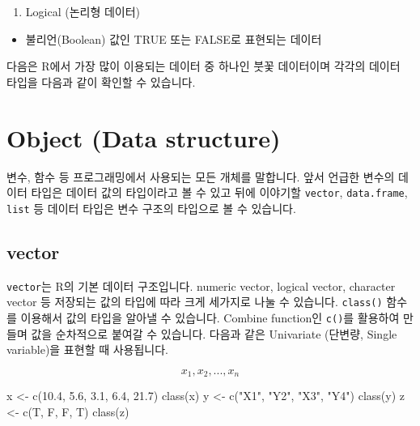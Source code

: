 \documentclass[
  a4paper,
]{book}
\newenvironment{Shaded}{\begin{snugshade}}{\end{snugshade}}
\newcommand{\FloatTok}[1]{\textcolor[rgb]{0.68,0.00,0.00}{#1}}
\newcommand{\FunctionTok}[1]{\textcolor[rgb]{0.28,0.35,0.67}{#1}}
\newcommand{\NormalTok}[1]{\textcolor[rgb]{0.00,0.23,0.31}{#1}}
\newcommand{\OtherTok}[1]{\textcolor[rgb]{0.00,0.23,0.31}{#1}}
\newcommand{\SpecialCharTok}[1]{\textcolor[rgb]{0.37,0.37,0.37}{#1}}
\newcommand{\StringTok}[1]{\textcolor[rgb]{0.13,0.47,0.30}{#1}}
\providecommand{\tightlist}{%
  \setlength{\itemsep}{0pt}\setlength{\parskip}{0pt}}\usepackage{longtable,booktabs,array}
\begin{document}
\begin{enumerate}
\def\labelenumi{\arabic{enumi}.}
\setcounter{enumi}{3}
\tightlist
\item
  Logical (논리형 데이터)
\end{enumerate}

\begin{itemize}
\tightlist
\item
  불리언(Boolean) 값인 TRUE 또는 FALSE로 표현되는 데이터
\end{itemize}

다음은 R에서 가장 많이 이용되는 데이터 중 하나인 붓꽃 데이터이며 각각의
데이터 타입을 다음과 같이 확인할 수 있습니다.

\begin{Shaded}
\end{Shaded}

\hypertarget{object-data-structure}{%
\section{Object (Data structure)}\label{object-data-structure}}

변수, 함수 등 프로그래밍에서 사용되는 모든 개체를 말합니다. 앞서 언급한
변수의 데이터 타입은 데이터 값의 타입이라고 볼 수 있고 뒤에 이야기할
\texttt{vector}, \texttt{data.frame}, \texttt{list} 등 데이터 타입은
변수 구조의 타입으로 볼 수 있습니다.

\hypertarget{vector}{%
\subsection{vector}\label{vector}}

\texttt{vector}는 R의 기본 데이터 구조입니다. numeric vector, logical
vector, character vector 등 저장되는 값의 타입에 따라 크게 세가지로 나눌
수 있습니다. \texttt{class()} 함수를 이용해서 값의 타입을 알아낼 수
있습니다. Combine function인 \texttt{c()}를 활용하여 만들며 값을
순차적으로 붙여갈 수 있습니다. 다음과 같은 Univariate (단변량, Single
variable)을 표현할 때 사용됩니다.

\[ x_1, x_2, ..., x_n \]

\begin{Shaded}
\begin{Highlighting}[]
\NormalTok{x }\OtherTok{\textless{}{-}} \FunctionTok{c}\NormalTok{(}\FloatTok{10.4}\NormalTok{, }\FloatTok{5.6}\NormalTok{, }\FloatTok{3.1}\NormalTok{, }\FloatTok{6.4}\NormalTok{, }\FloatTok{21.7}\NormalTok{) }
\FunctionTok{class}\NormalTok{(x)}
\NormalTok{y }\OtherTok{\textless{}{-}} \FunctionTok{c}\NormalTok{(}\StringTok{"X1"}\NormalTok{, }\StringTok{"Y2"}\NormalTok{,  }\StringTok{"X3"}\NormalTok{,  }\StringTok{"Y4"}\NormalTok{)}
\FunctionTok{class}\NormalTok{(y)}
\NormalTok{z }\OtherTok{\textless{}{-}} \FunctionTok{c}\NormalTok{(T, F, F, T)}
\FunctionTok{class}\NormalTok{(z)}
\end{Highlighting}
\end{Shaded}
\end{document}

